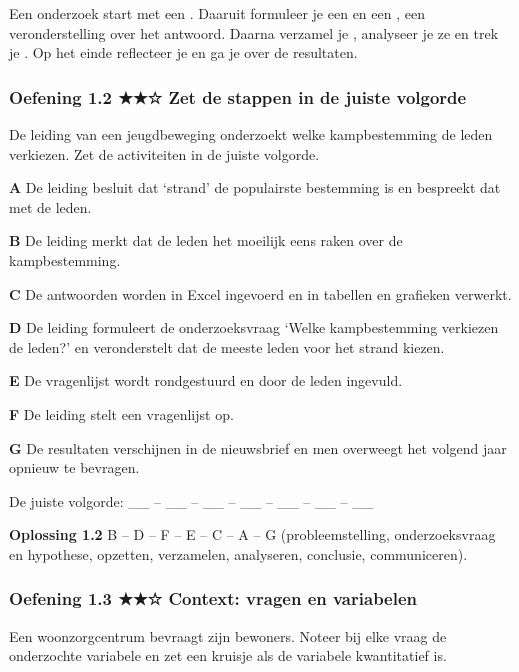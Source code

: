 Een onderzoek start met een . Daaruit formuleer je een  en een , een veronderstelling over het antwoord. Daarna verzamel je , analyseer je ze en trek je . Op het einde reflecteer je en ga je  over de resultaten.

\subsubsection*{Oefening 1.2 \quad ★★☆ \quad Zet de stappen in de juiste volgorde}

De leiding van een jeugdbeweging onderzoekt welke kampbestemming de leden verkiezen. Zet de activiteiten in de juiste volgorde.

\textbf{A} De leiding besluit dat ‘strand’ de populairste bestemming is en bespreekt dat met de leden.

\textbf{B} De leiding merkt dat de leden het moeilijk eens raken over de kampbestemming.

\textbf{C} De antwoorden worden in Excel ingevoerd en in tabellen en grafieken verwerkt.

\textbf{D} De leiding formuleert de onderzoeksvraag ‘Welke kampbestemming verkiezen de leden?’ en veronderstelt dat de meeste leden voor het strand kiezen.

\textbf{E} De vragenlijst wordt rondgestuurd en door de leden ingevuld.

\textbf{F} De leiding stelt een vragenlijst op.

\textbf{G} De resultaten verschijnen in de nieuwsbrief en men overweegt het volgend jaar opnieuw te bevragen.

De juiste volgorde: \_\_ – \_\_ – \_\_ – \_\_ – \_\_ – \_\_ – \_\_

\begin{oplossing}
\textbf{Oplossing 1.2} \quad B – D – F – E – C – A – G (probleemstelling, onderzoeksvraag en hypothese, opzetten, verzamelen, analyseren, conclusie, communiceren).
\end{oplossing}

\subsubsection*{Oefening 1.3 \quad ★★☆ \quad Context: vragen en variabelen}

Een woonzorgcentrum bevraagt zijn bewoners. Noteer bij elke vraag de onderzochte variabele en zet een kruisje als de variabele kwantitatief is.

